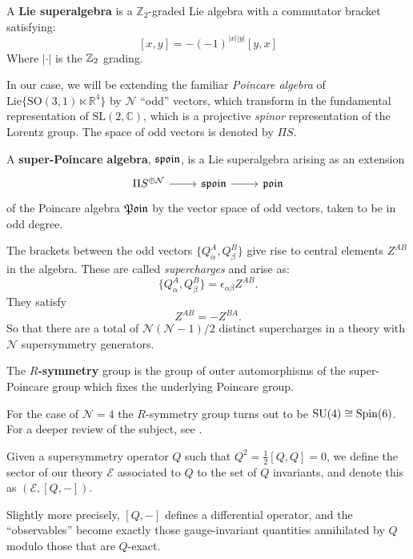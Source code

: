 	\begin{defn}
	A \textbf{Lie superalgebra} is a $\mathbb Z_2$-graded Lie algebra with a commutator bracket satisfying:
		$$[x, y]= -(-1)^{|x||y|} [y, x]$$
	Where $|\cdot|$ is the $\mathbb{Z}_2$ grading.
	\end{defn}
	In our case, we will be extending the familiar \emph{Poincare algebra} of $\mathrm{Lie}\{ \mathrm{SO}(3, 1) \ltimes \mathbb R^4  \}$ by $\mathcal N$ ``odd'' vectors, which transform in the fundamental representation of $\mathrm{SL(2, \mathbb C)}$, which is a projective \emph{spinor} representation of the Lorentz group. The space of odd vectors is denoted by $\Pi S$.
	\begin{defn}
		A \textbf{super-Poincare algebra}, $\frak{spoin}$, is a Lie superalgebra arising as an extension
		\[
			\begin{tikzcd}
				\Pi S^{\oplus \mathcal N} \arrow[r] & \frak{spoin} \arrow[r] & \frak{poin}
			\end{tikzcd}
		\]
		of the Poincare algebra $\frak{Poin}$ by the vector space of odd vectors, taken to be in odd degree.
	\end{defn}
	
	The brackets between the odd vectors $\{Q^A_\alpha, Q^B_\beta \} $ give rise to  central elements $Z^{AB}$ in the algebra. These are called \emph{supercharges} and arise as:
	$$\{Q^A_\alpha, Q^B_\beta \} = \epsilon_{\alpha \beta} Z^{AB}.$$
	They satisfy
	$$Z^{AB} = -Z^{BA}.$$
	So that there are a total of $\mathcal N (\mathcal N - 1)/2$ distinct supercharges in a theory with $\mathcal N$ supersymmetry generators. 
	
	\begin{defn}
		The \textbf{$R$-symmetry} group is the group of outer automorphisms of the super-Poincare group which fixes the underlying Poincare group. 
	\end{defn}
	For the case of $\mathcal N = 4$ the $R$-symmetry group turns out to be $\mathrm{SU}(4) \cong \mathrm{Spin}(6)$. For a deeper review of the subject, see \cite{quevedo2010}.
	
	\begin{phys}[Sector]
		Given a supersymmetry operator $Q$ such that $Q^2 = \frac{1}{2} [Q, Q] = 0$, we define the sector of our theory $\mathcal E$ associated to $Q$ to the set of $Q$ invariants, and denote this as $(\mathcal E, [Q, -])$.
		
		Slightly more precisely, $[Q, -]$ defines a differential operator, and the ``observables'' become exactly those gauge-invariant quantities annihilated by $Q$ modulo those that are $Q$-exact.
	\end{phys}

	